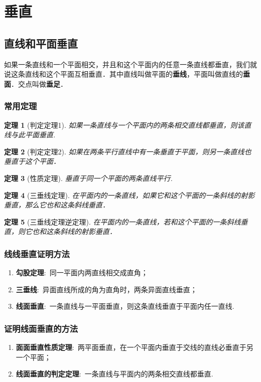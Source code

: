 \documentclass{BHCexam}
\newcommand{\tbf}[1]{\item \textbf{#1}:\ }
\newtheorem{Therome}{定理}[section]
\begin{document}
\section{垂直}
\subsection{直线和平面垂直}
如果一条直线和一个平面相交，并且和这个平面内的任意一条直线都垂直，我们就说这条直线和这个平面互相垂直．其中直线叫做平面的\textbf{垂线}，平面叫做直线的\textbf{垂面}．交点叫做\textbf{垂足}．
\subsubsection{常用定理}


\begin{Therome}[判定定理1]
如果一条直线与一个平面内的两条相交直线都垂直，则该直线与此平面垂直.
\end{Therome}
\begin{Therome}[判定定理2]
如果在两条平行直线中有一条垂直于平面，则另一条直线也垂直于这个平面．
\end{Therome}
\begin{Therome}[性质定理]
垂直于同一个平面的两条直线平行.
\end{Therome}
\begin{Therome}[三垂线定理]
在平面内的一条直线，如果它和这个平面的一条斜线的射影垂直，那么它也和这条斜线垂直．
\end{Therome}
\begin{Therome}[三垂线定理逆定理]
在平面内的一条直线，若和这个平面的一条斜线垂直，则它也和这条斜线的射影垂直．
\end{Therome}
\subsubsection{线线垂直证明方法}
\begin{enumerate}[1)]
\tbf{勾股定理}同一平面内两直线相交成直角；
\tbf{三垂线}异面直线所成的角为直角时，两条异面直线垂直；
\tbf{线面垂直}一条直线与一平面垂直，则这条直线垂直于平面内任一直线.
\end{enumerate}
\subsubsection{证明线面垂直的方法}
\begin{enumerate}[1)]
\tbf{面面垂直性质定理}两平面垂直，在一个平面内垂直于交线的直线必垂直于另一个平面；
\tbf{线面垂直的判定定理}一条直线与平面内的两条相交直线都垂直.
\end{enumerate}
\end{document}
